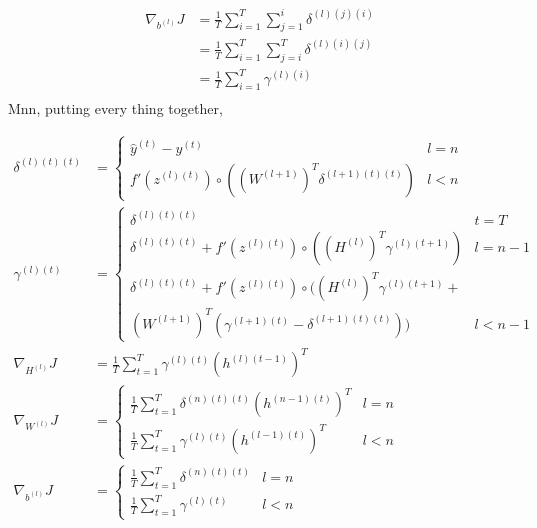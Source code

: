 \documentclass{article}
\begin{document}
	\begin{equation}
	\begin{aligned}
		\nabla_{b^{(l)}} J 
		&= \frac{1}{T} \sum_{i=1}^{T} \sum_{j=1}^{i} \delta^{(l)(j)(i)} \\
		&= \frac{1}{T} \sum_{i=1}^{T} \sum_{j=i}^{T} \delta^{(l)(i)(j)} \\
		&= \frac{1}{T} \sum_{i=1}^{T} \gamma^{(l)(i)} \\
	\end{aligned}
	\end{equation}
	Mnn, putting every thing together,
	\begin{framed}
	\begin{align}
		\delta^{(l)(t)(t)} &=
		\begin{cases}
			\hat{y}^{(t)} - y^{(t)} &l=n\\	
			f'(z^{(l)(t)}) \circ ((W^{(l+1)})^T \delta^{(l+1)(t)(t)}) &l<n
		\end{cases} 
		\\
		\gamma^{(l)(t)} &= 
		\begin{cases}
		\delta^{(l)(t)(t)} &t=T
		\\
		\delta^{(l)(t)(t)} + f'(z^{(l)(t)}) \circ ((H^{(l)})^T \gamma^{(l)(t+1)}) &l=n-1
		\\
		\delta^{(l)(t)(t)} + f'(z^{(l)(t)}) \circ ((H^{(l)})^T \gamma^{(l)(t+1)} + \\ (W^{(l+1)})^T (\gamma^{(l+1)(t)} - \delta^{(l+1)(t)(t)})) &l<n-1
		\end{cases}
		\\
		\nabla_{H^{(l)}} J &= \frac{1}{T} \sum_{t=1}^{T} \gamma^{(l)(t)} (h^{(l)(t-1)})^T
		\\
		\nabla_{W^{(l)}} J &= 
		\begin{cases}
		\frac{1}{T} \sum_{t=1}^{T}\delta^{(n)(t)(t)} (h^{(n-1)(t)})^T &l=n\\
		\frac{1}{T} \sum_{t=1}^{T} \gamma^{(l)(t)} (h^{(l-1)(t)})^T &l<n
		\end{cases}		
		\\
		\nabla_{b^{(l)}} J &= 
		\begin{cases}
		\frac{1}{T} \sum_{t=1}^{T}\delta^{(n)(t)(t)} &l=n \\
		\frac{1}{T} \sum_{t=1}^{T} \gamma^{(l)(t)} &l<n
		\end{cases}
	\end{align}
	\end{framed}
\end{document}
